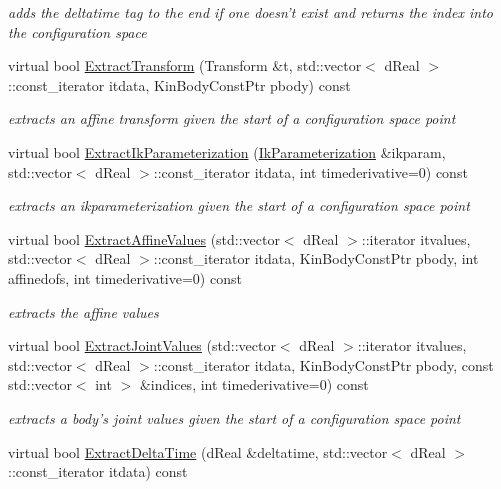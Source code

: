 \begin{DoxyCompactItemize}
\begin{DoxyCompactList}\small\item\em adds the deltatime tag to the end if one doesn't exist and returns the index into the configuration space \item\end{DoxyCompactList}\item 
virtual bool \hyperlink{classOpenRAVE_1_1ConfigurationSpecification_a49774ecb66f1a96880369215a33d079b}{ExtractTransform} (Transform \&t, std::vector$<$ dReal $>$::const\_\-iterator itdata, KinBodyConstPtr pbody) const 
\begin{DoxyCompactList}\small\item\em extracts an affine transform given the start of a configuration space point \item\end{DoxyCompactList}\item 
virtual bool \hyperlink{classOpenRAVE_1_1ConfigurationSpecification_aba9ff3f41a4bb1b06bf0691a0141ca78}{ExtractIkParameterization} (\hyperlink{classOpenRAVE_1_1IkParameterization}{IkParameterization} \&ikparam, std::vector$<$ dReal $>$::const\_\-iterator itdata, int timederivative=0) const 
\begin{DoxyCompactList}\small\item\em extracts an ikparameterization given the start of a configuration space point \item\end{DoxyCompactList}\item 
virtual bool \hyperlink{classOpenRAVE_1_1ConfigurationSpecification_a572098999c73392e7f0020e6729def4c}{ExtractAffineValues} (std::vector$<$ dReal $>$::iterator itvalues, std::vector$<$ dReal $>$::const\_\-iterator itdata, KinBodyConstPtr pbody, int affinedofs, int timederivative=0) const 
\begin{DoxyCompactList}\small\item\em extracts the affine values \item\end{DoxyCompactList}\item 
virtual bool \hyperlink{classOpenRAVE_1_1ConfigurationSpecification_ac04681582ab6d866a55da90e9913bfc2}{ExtractJointValues} (std::vector$<$ dReal $>$::iterator itvalues, std::vector$<$ dReal $>$::const\_\-iterator itdata, KinBodyConstPtr pbody, const std::vector$<$ int $>$ \&indices, int timederivative=0) const 
\begin{DoxyCompactList}\small\item\em extracts a body's joint values given the start of a configuration space point \item\end{DoxyCompactList}\item 
\hypertarget{classOpenRAVE_1_1ConfigurationSpecification_aa694d87f503fe4593f8b60e3bf8175b5}{
virtual bool \hyperlink{classOpenRAVE_1_1ConfigurationSpecification_aa694d87f503fe4593f8b60e3bf8175b5}{ExtractDeltaTime} (dReal \&deltatime, std::vector$<$ dReal $>$::const\_\-iterator itdata) const }
\label{classOpenRAVE_1_1ConfigurationSpecification_aa694d87f503fe4593f8b60e3bf8175b5}


\end{DoxyCompactItemize}
